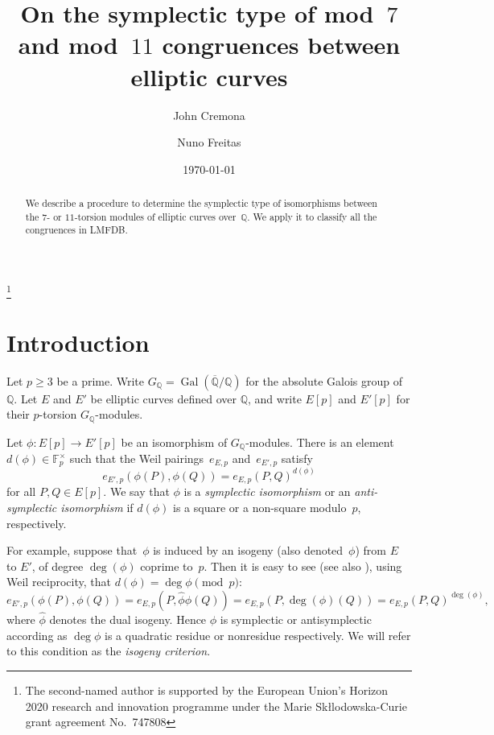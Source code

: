 \documentclass[12pt]{amsart}
\newcommand{\F}{\mathbb{F}}
\newcommand{\Q}{\mathbb{Q}}
\newcommand{\Qbar}{{\overline{\Q}}}
\DeclareMathOperator{\Gal}{Gal}
\numberwithin{equation}{section}
\theoremstyle{definition}
\theoremstyle{remark}
\begin{document}
\title{On the symplectic type of mod~$7$ and mod~$11$ congruences between elliptic curves}

\author{John Cremona}
\address{Mathematics Institute,
         University of Warwick,
         Coventry CV4 7AL,
         United Kingdom}


\author{Nuno Freitas}
\address{Mathematics Institute,
         University of Warwick,
         Coventry CV4 7AL,
         United Kingdom}


\date{\today}


\thanks{The second-named author is supported by the European Union's
  Horizon 2020 research and innovation programme under the Marie
  Sk\l{l}odowska-Curie grant agreement No.\ 747808}


\begin{abstract} 
We describe a procedure to determine the symplectic type of
isomorphisms between the $7$- or $11$-torsion modules of elliptic curves over~$\Q$.  We
apply it to classify all the congruences in LMFDB.
\end{abstract}

\maketitle


\section{Introduction}

Let $p \geq 3$ be a prime. Write $G_\Q = \Gal(\Qbar/\Q)$ for the
absolute Galois group of $\Q$.  Let $E$ and $E'$ be elliptic curves defined over $\Q$, and write $E[p]$ and $E'[p]$ for their $p$-torsion $G_\Q$-modules.

Let $\phi : E[p] \to E'[p]$ be an isomorphism of $G_\Q$-modules.
There is an element $d(\phi) \in \F_p^\times$ such that the Weil 
pairings~$e_{E,p}$ and~$e_{E',p}$ satisfy
\[
e_{E',p}(\phi(P), \phi(Q)) = e_{E,p}(P, Q)^{d(\phi)}
\]
for all $P, Q \in E[p]$.  We say that $\phi$ is a {\it symplectic
  isomorphism} or an {\it anti-symplectic isomorphism} if $d(\phi)$ is
a square or a non-square modulo~$p$, respectively.

For example, suppose that~$\phi$ is induced by an isogeny (also
denoted~$\phi$) from $E$ to $E'$, of degree $\deg(\phi)$ coprime
to~$p$.  Then it is easy to see (see also \cite[Corollary~1]{FKSym}),
using Weil reciprocity, that $d(\phi)=\deg\phi\pmod{p}$:
\[
  e_{E',p}(\phi(P), \phi(Q)) = e_{E,p}(P, \hat\phi\phi(Q)) =
  e_{E,p}(P, \deg(\phi)(Q)) = e_{E,p}(P, Q)^{\deg(\phi)},
  \]
  where $\hat{\phi}$ denotes the dual isogeny.
Hence $\phi$ is symplectic or antisymplectic according as $\deg\phi$
is a quadratic residue or nonresidue respectively.  We will refer to
this condition as the \emph{isogeny criterion}.
\end{document}
